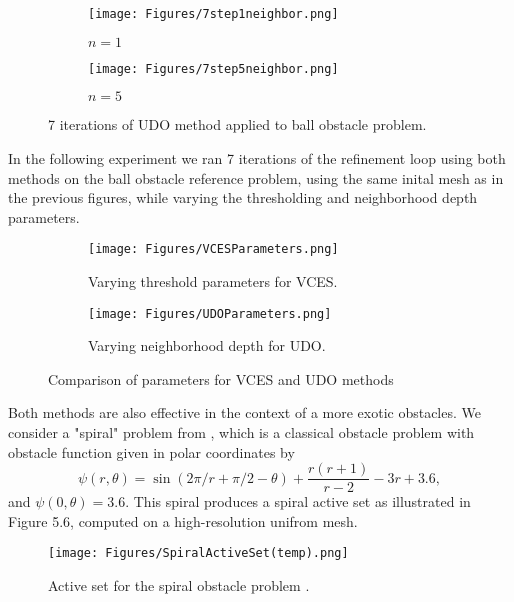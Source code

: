 \documentclass[12 pt]{report}
\begin{document}
\begin{figure}[H]
  \centering
  \begin{subfigure}[b]{0.45\textwidth}
      \centering
      \texttt{[image: Figures/7step1neighbor.png]}
      \caption{$n = 1$}
      \label{fig:image1}
  \end{subfigure}
  \hfill
  \begin{subfigure}[b]{0.45\textwidth}
      \centering
      \texttt{[image: Figures/7step5neighbor.png]}
      \caption{$n = 5$}
      \label{fig:image2}
  \end{subfigure}
  \vspace*{.25cm}
  \caption{7 iterations of UDO method applied to ball obstacle problem.}
  \label{fig:two_images}
\end{figure}
In the following experiment we ran 7 iterations of the refinement loop using both methods on the ball obstacle reference problem, using the same inital mesh as in the previous figures, while varying the thresholding and neighborhood depth parameters. 
\begin{figure}[H]
  \centering
  \begin{subfigure}[b]{.80\textwidth}
      \centering
      \texttt{[image: Figures/VCESParameters.png]}
      \caption{Varying threshold parameters for VCES.}
      \label{fig:top}
  \end{subfigure}
  
  \vspace{1em} %

  \begin{subfigure}[b]{.80\textwidth}
      \centering
      \texttt{[image: Figures/UDOParameters.png]}
      \caption{Varying neighborhood depth for UDO.}
      \label{fig:bottom}
  \end{subfigure}
  
  \caption{Comparison of parameters for VCES and UDO methods}
  \label{fig:combined}
\end{figure}

Both methods are also effective in the context of a more exotic obstacles. We consider a "spiral" problem from \citet{graser_multigrid_2009}, which is a classical obstacle problem with obstacle function given in polar coordinates by 
\begin{equation}
  \psi(r, \theta) = \sin(2\pi/r + \pi/2 - \theta) + \frac{r(r + 1)}{r - 2} - 3r + 3.6,
\end{equation}
and $\psi(0, \theta) = 3.6$. This spiral produces a spiral active set as illustrated in Figure 5.6, computed on a high-resolution unifrom mesh. 
\begin{figure}[H]
  \centering
  \texttt{[image: Figures/SpiralActiveSet(temp).png]}
  \caption{Active set for the spiral obstacle problem \citep{bueler_full_2023}.}
\end{figure} 
\end{document}
